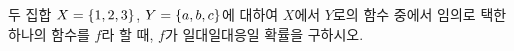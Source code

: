 두 집합 $X=\{1{,}\mkern3mu\mathopen{}2{,}\mkern3mu\mathopen{}3\}$, $Y=\{a{,}\mkern3mu\mathopen{}b{,}\mkern3mu\mathopen{}c\}$에 대하여 $X$에서 $Y$로의 함수 중에서 임의로 택한 하나의 함수를 $f$라 할 때, $f$가 일대일대응일 확률을 구하시오.
